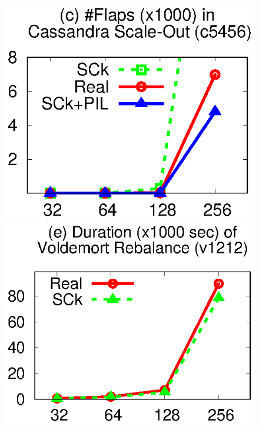 \begin{figure}[t]
\centerline{
\hmina
\includegraphics[width=\fgw]{F/old-bugs/eps/cass4.eps}
\hminb
\includegraphics[width=\fgw]{F/old-bugs/eps/vold1.eps}
}


\end{figure}
